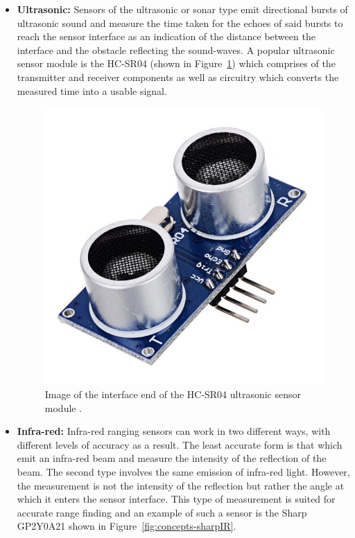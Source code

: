       \begin{itemize}
        \item \textbf{Ultrasonic:} Sensors of the ultrasonic or sonar type emit directional bursts of ultrasonic sound and measure the time taken for the echoes of said bursts to reach the sensor interface as an indication of the distance between the interface and the obstacle reflecting the sound-waves. A popular ultrasonic sensor module is the HC-SR04 (shown in Figure~\ref{fig:concepts-hcsr04}) which comprises of the transmitter and receiver components as well as circuitry which converts the measured time into a usable signal.
        
        \begin{figure}[h!]
          \centering
          \includegraphics[width=0.4\linewidth]{figures/concepts-hcsr04}
          \caption[Image of the interface end of the HC-SR04 ultrasonic sensor module.]{Image of the interface end of the HC-SR04 ultrasonic sensor module \cite{fig:concepts-hcsr04_cite}.}
          \label{fig:concepts-hcsr04}
        \end{figure}
 
        \item \textbf{Infra-red:} Infra-red ranging sensors can work in two different ways, with different levels of accuracy as a result. The least accurate form is that which emit an infra-red beam and measure the intensity of the reflection of the beam. The second type involves the same emission of infra-red light. However, the measurement is not the intensity of the reflection but rather the angle at which it enters the sensor interface. This type of measurement is suited for accurate range finding and an example of such a sensor is the Sharp GP2Y0A21 shown in Figure~\ref{fig:concepts-sharpIR}.
        

\end{itemize}
